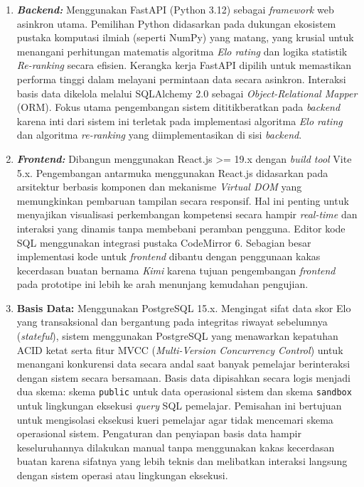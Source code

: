 \begin{enumerate}
    \item \textbf{\textit{Backend:}} Menggunakan FastAPI (Python 3.12) sebagai \textit{framework} web asinkron utama. Pemilihan Python didasarkan pada dukungan ekosistem pustaka komputasi ilmiah (seperti NumPy) yang matang, yang krusial untuk menangani perhitungan matematis algoritma \textit{Elo rating} dan logika statistik \textit{Re-ranking} secara efisien. Kerangka kerja FastAPI dipilih untuk memastikan performa tinggi dalam melayani permintaan data secara asinkron. Interaksi basis data dikelola melalui SQLAlchemy 2.0 sebagai \textit{Object-Relational Mapper} (ORM). Fokus utama pengembangan sistem dititikberatkan pada \textit{backend} karena inti dari sistem ini terletak pada implementasi algoritma \textit{Elo rating} dan algoritma \textit{re-ranking} yang diimplementasikan di sisi \textit{backend}.
    \item \textbf{\textit{Frontend:}} Dibangun menggunakan React.js >= 19.x dengan \textit{build tool} Vite 5.x. Pengembangan antarmuka menggunakan React.js didasarkan pada arsitektur berbasis komponen dan mekanisme \textit{Virtual DOM} yang memungkinkan pembaruan tampilan secara responsif. Hal ini penting untuk menyajikan visualisasi perkembangan kompetensi secara hampir \textit{real-time} dan interaksi yang dinamis tanpa membebani peramban pengguna. Editor kode SQL menggunakan integrasi pustaka CodeMirror 6. Sebagian besar implementasi kode untuk \textit{frontend} dibantu dengan penggunaan kakas kecerdasan buatan bernama \textit{Kimi} karena tujuan pengembangan \textit{frontend} pada prototipe ini lebih ke arah menunjang kemudahan pengujian.
    \item \textbf{Basis Data:} Menggunakan PostgreSQL 15.x. Mengingat sifat data skor Elo yang transaksional dan bergantung pada integritas riwayat sebelumnya (\textit{stateful}), sistem menggunakan PostgreSQL yang menawarkan kepatuhan ACID ketat serta fitur MVCC (\textit{Multi-Version Concurrency Control}) untuk menangani konkurensi data secara andal saat banyak pemelajar berinteraksi dengan sistem secara bersamaan. Basis data dipisahkan secara logis menjadi dua skema: skema \texttt{public} untuk data operasional sistem dan skema \texttt{sandbox} untuk lingkungan eksekusi \textit{query} SQL pemelajar. Pemisahan ini bertujuan untuk mengisolasi eksekusi kueri pemelajar agar tidak mencemari skema operasional sistem. Pengaturan dan penyiapan basis data hampir keseluruhannya dilakukan manual tanpa menggunakan kakas kecerdasan buatan karena sifatnya yang lebih teknis dan melibatkan interaksi langsung dengan sistem operasi atau lingkungan eksekusi.
\end{enumerate}

